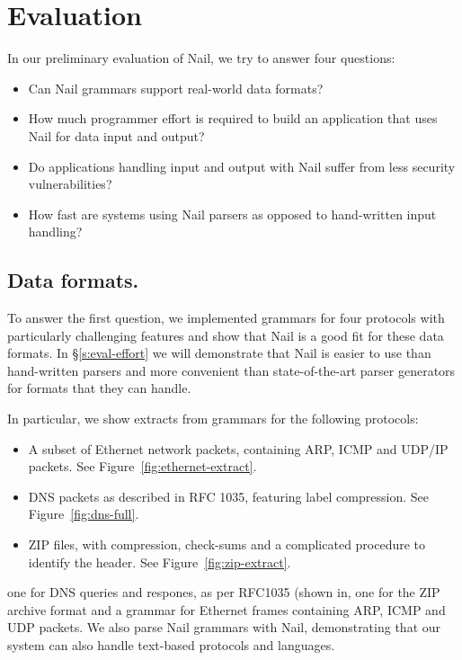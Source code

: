 \section{Evaluation}
\label{s:eval}



In our preliminary evaluation of Nail, we try to answer four questions:

\begin{itemize}
\item Can Nail grammars support real-world data formats?
\item How much programmer effort is required to build an
      application that uses Nail for data input and output?
\item Do applications handling input and output with Nail suffer from less security vulnerabilities?
\item How fast are systems using Nail parsers as opposed to hand-written input handling? 
\end{itemize}

\subsection{Data formats.}
\label{s:eval-formats}
To answer the first question, we implemented grammars for four protocols with particularly
challenging features and show that Nail is a good fit for these data formats. In
\S\ref{s:eval-effort} we will demonstrate that Nail is easier to use than hand-written parsers and
more convenient than state-of-the-art parser generators for formats that they can handle.

In particular, we show extracts from grammars for the following protocols: 
\begin{itemize}
\item A subset of Ethernet network packets, containing ARP, ICMP and UDP/IP packets. See Figure~\ref{fig:ethernet-extract}.
\item DNS packets as described in RFC 1035, featuring label compression. See Figure~\ref{fig:dns-full}.
\item ZIP files, with compression, check-sums and a complicated procedure to identify the header.
  See Figure~\ref{fig:zip-extract}.
\end{itemize}




one for  DNS queries and respones, as per RFC1035 (shown in, one for the ZIP
archive format and a grammar for Ethernet frames containing ARP, ICMP and UDP packets. We also
parse Nail grammars with Nail, demonstrating that our system can also handle text-based protocols
and languages.  

